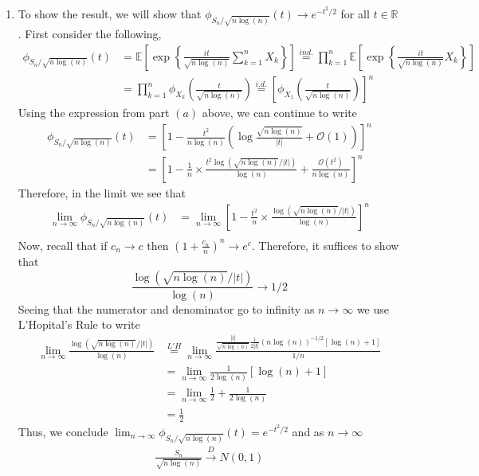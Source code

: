 \documentclass[12pt]{article}  %
\newcommand{\R}{{\mathbb{R}}}
\newcommand{\E}{{\mathbb{E}}}
\begin{document}
\begin{enumerate}
\begin{enumerate}
\item To show the result, we will show that $\phi_{S_n/\sqrt{n\log(n)}}(t)\longrightarrow e^{-t^2/2}$ for all $t\in\R$. First consider the following, 
\begin{align*}
\phi_{S_n/\sqrt{n\log(n)}}(t) &= \E\left[\exp\left\{\frac{it}{\sqrt{n\log(n)}}\sum_{k=1}^nX_k \right\}\right] \overset{ind.}{=} \prod_{k= 1}^n \E\left[\exp\left\{\frac{it}{\sqrt{n\log(n)}}X_k\right\}\right]\\
&= \prod_{k=1}^n\phi_{X_k}\left(\frac{t}{\sqrt{n\log(n)}}\right) \overset{i.d.}{=} \left[\phi_{X_1}\left(\frac{t}{\sqrt{n\log(n)}}\right)\right]^n 
\end{align*}
Using the expression from part $(a)$ above, we can continue to write 
\begin{align*}
\phi_{S_n/\sqrt{n\log(n)}}(t) &= \left[1 - \frac{t^2}{n\log(n)}\left(\log\frac{\sqrt{n\log(n)}}{|t|} + \mathcal{O}(1)\right)\right]^n\\
&= \left[1 - \frac{1}{n}\times\frac{t^2\log(\sqrt{n\log(n)}/|t|)}{\log(n)} + \frac{\mathcal{O}(t^2)}{n\log(n)}\right]^n
\end{align*}
Therefore, in the limit we see that 
\begin{align*}
\lim_{n\to\infty}\phi_{S_n/\sqrt{n\log(n)}}(t) &= \lim_{n\to\infty}\left[1 - \frac{t^2}{n}\times\frac{\log(\sqrt{n\log(n)}/|t|)}{\log(n)}\right]^n\\
\end{align*}
Now, recall that if $c_n\to c$ then $(1 + \frac{c_n}{n})^n \to e^{c}$. Therefore, it suffices to show that $$\frac{\log(\sqrt{n\log(n)}/|t|)}{\log(n)} \longrightarrow 1/2$$
Seeing that the numerator and denominator go to infinity as $n\to\infty$ we use L'Hopital's Rule to write 
\begin{align*}
\lim_{n\to\infty}\frac{\log(\sqrt{n\log(n)}/|t|)}{\log(n)} &\overset{L'H}{=}\lim_{n\to\infty}\frac{\frac{|t|}{\sqrt{n\log(n)}}\frac{1}{2|t|}(n\log(n))^{-1/2}[\log(n) + 1]}{1/n}\\
&= \lim_{n\to\infty} \frac{1}{2\log(n)}[\log(n)+1]\\
&= \lim_{n\to\infty} \frac{1}{2} + \frac{1}{2\log(n)}\\
&= \frac{1}{2}
\end{align*}
Thus, we conclude $\lim_{n\to\infty}\phi_{S_n/\sqrt{n\log(n)}}(t) = e^{-t^2/2}$ and as $n\to\infty$
\begin{align*}
\frac{S_n}{\sqrt{n\log(n)}}\overset{D}{\longrightarrow} N(0,1)
\end{align*}


\end{enumerate}
\end{enumerate}	
\end{document}
